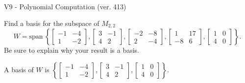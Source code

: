 \begin{exercise}
  \begin{exerciseTitle}V9 - Polynomial Computation (ver. 413)\end{exerciseTitle}
  \begin{exerciseStatement}
    Find a basis for the subspace of \(M_{2,2}\) 
\[W=\mathrm{span}\ \left\{\left[\begin{array}{cc}
-1 & -4 \\
1 & -2
\end{array}\right] , \left[\begin{array}{cc}
3 & -1 \\
4 & 2
\end{array}\right] , \left[\begin{array}{cc}
-2 & -8 \\
2 & -4
\end{array}\right] , \left[\begin{array}{cc}
1 & 17 \\
-8 & 6
\end{array}\right] , \left[\begin{array}{cc}
1 & 0 \\
4 & 0
\end{array}\right]\right\}.\]
 Be sure to explain why your result is a basis.


  \end{exerciseStatement}
  \begin{exerciseAnswer}
   A basis of \(W\) is  \(\left\{\left[\begin{array}{cc}
-1 & -4 \\
1 & -2
\end{array}\right] , \left[\begin{array}{cc}
3 & -1 \\
4 & 2
\end{array}\right] , \left[\begin{array}{cc}
1 & 0 \\
4 & 0
\end{array}\right]\right\}\).
  


  \end{exerciseAnswer}
\end{exercise}